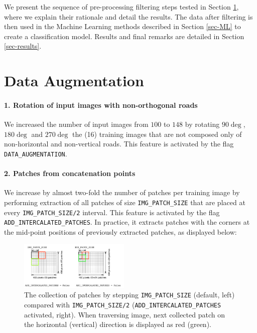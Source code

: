 \documentclass[fleqn,9 pt]{SelfArx} %
\affiliation{\textbf{Email (SCIPER):} \hspace{0.2cm} \textsuperscript{1} bruno.magalhaes@epfl.ch (212079) \hspace{0.2cm} \textsuperscript{2} marie.drieghe@epfl.ch (273688) \hspace{0.2cm} \textsuperscript{3} nicolas.casademont@epfl.ch (223485)}
\begin{document}
\begin{sloppypar} %

\flushbottom %
\maketitle %
\thispagestyle{empty} %

We present the sequence of pre-processing filtering steps tested in Section \ref{sec-pre-proc}, where we explain their rationale and detail the results. The data after filtering is then used in the Machine Learning methods described in Section \ref{sec-ML} to create a classification model. Results and final remarks are detailed in Section \ref{sec-results}.

\section{Data Augmentation}
\label{sec-pre-proc}

\paragraph{1. Rotation of input images with non-orthogonal roads} We increased the number of input images from $100$ to $148$ by rotating $90 \deg$, $180 \deg$ and $270 \deg$ the (16) training images that are not composed only of non-horizontal and non-vertical roads. This feature is activated by the flag \texttt{DATA\_AUGMENTATION}.

\paragraph{2. Patches from concatenation points} We increase by almost two-fold the number of patches per training image by performing extraction of all patches of size \texttt{IMG\_PATCH\_SIZE} that are placed at every \texttt{IMG\_PATCH\_SIZE/2} interval. This feature is activated by the flag \texttt{ADD\_INTERCALATED\_PATCHES}. In practice, it extracts patches with the corners at the mid-point positions of previously extracted patches, as displayed below:

\begin{figure}[H]
\centering
\includegraphics[width=0.47\textwidth]{figures/ADD_INTERCALATED_PATCHES.pdf}
\caption{\small The collection of patches by stepping \texttt{IMG\_PATCH\_SIZE} (default, left) compared with \texttt{IMG\_PATCH\_SIZE/2} (\texttt{ADD\_INTERCALATED\_PATCHES} activated, right). When traversing image, next collected patch on the horizontal (vertical) direction is displayed as red (green).}
\end{figure}


\end{sloppypar}
\end{document}
